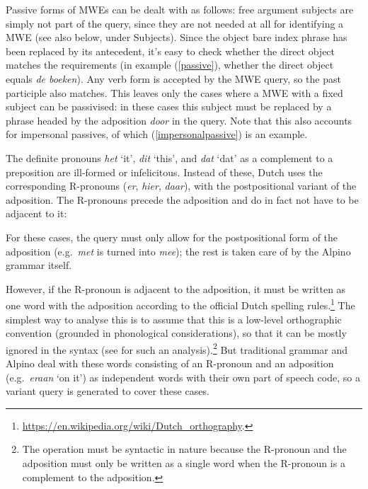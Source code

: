 \documentclass[output=paper,colorlinks,citecolor=brown]{langscibook}
\begin{document}
Passive forms of MWEs can be dealt with as follows: free argument subjects  are simply not part of the query, since they are not needed at all for identifying a MWE (see also below, under Subjects). Since the object bare index phrase has been replaced by its antecedent, it's easy to check whether the direct object matches the requirements (in example (\ref{passive}), whether the direct object equals \textit{de boeken}). Any verb form is accepted by the MWE query, so the past participle also matches. This leaves only the cases where a MWE with a fixed subject can be passivised: in these cases this subject must be replaced by a phrase headed by the adposition \textit{door} in the query. Note that this also accounts for impersonal passives, of which (\ref{impersonalpassive}) is an example.


 The definite pronouns \textit{het} `it', \textit{dit} `this', and \textit{dat} `dat' as a complement to a preposition are ill-formed or infelicitous. Instead of these, Dutch uses the corresponding R-pronouns (\textit{er}, \textit{hier}, \textit{daar}), with the postpositional variant of the adposition. The R-pronouns precede the adposition and do in fact not have to be adjacent to it:

\begin{exe}
\ex
\begin{xlist}

\end{xlist}
\end{exe}

For these cases, the query must only allow for the postpositional form of the adposition (e.g.\ \textit{met} is turned into \textit{mee}); the rest is taken care of by the Alpino grammar itself.

However, if the R-pronoun is adjacent to the adposition, it must  be written as one word with the adposition according to the official Dutch spelling rules.\footnote{\url{https://en.wikipedia.org/wiki/Dutch_orthography}.} The simplest way to analyse this is to assume that this is a low-level orthographic convention (grounded in phonological considerations), so that it can be mostly ignored in the syntax (see \cite[115--116]{Rosettaboek:94} for such an analysis).\footnote{The operation must be syntactic in nature because the R-pronoun and the adposition must only be written as a single word when the R-pronoun is a complement to the adposition.} But traditional grammar and Alpino deal with these words consisting of an R-pronoun and an adposition (e.g.\ \textit{eraan} `on it') as independent words with their own part of speech code, so a variant query is generated to cover these cases.
\end{document}
